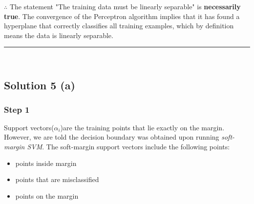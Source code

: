 \documentclass{article}
\begin{document}
\subsubsection*{\normalfont}{$\therefore$ The statement "The training data must be linearly separable" is \textbf{necessarily true}. The convergence of the Perceptron algorithm implies that it has found a hyperplane that correctly classifies all training examples, which by definition means the data is linearly separable.}

\noindent\rule{\textwidth}{0.4pt}\\

\newpage
\subsection*{Solution 5 (a)}
\subsubsection*{Step 1}
\parbox{\textwidth}{
Support vectors($\alpha_i$)are the training points that lie exactly on the margin. However, we are told the decision boundary was obtained upon running \textit{soft-margin SVM}.
The soft-margin support vectors include the following points:
\begin{itemize}
  \item points inside margin
  \item points that are misclassified
  \item points on the margin
\end{itemize}
}
\end{document}
